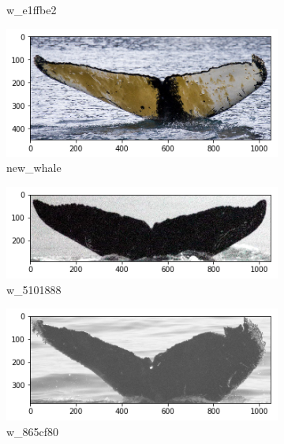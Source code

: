 \begin{frame}[c]
\begin{figure}
\begin{subfigure}[b]{0.24\linewidth}
            \caption{w\_e1ffbe2}
        \end{subfigure}
        \begin{subfigure}[b]{0.24\linewidth}
            \centering
            \includegraphics[width=\linewidth]{Whales/new_whale3.png}
            \caption{new\_whale}
        \end{subfigure}
        \begin{subfigure}[b]{0.24\linewidth}
            \centering
            \includegraphics[width=\linewidth]{Whales/w_5101888.png}
            \caption{w\_5101888}
        \end{subfigure}
        \begin{subfigure}[b]{0.24\linewidth}
            \centering
            \includegraphics[width=\linewidth]{Whales/w_865cf80.png}
            \caption{w\_865cf80}
        \end{subfigure}
        \begin{subfigure}[b]{0.24\linewidth}

\end{subfigure}
\end{figure}
\end{frame}
